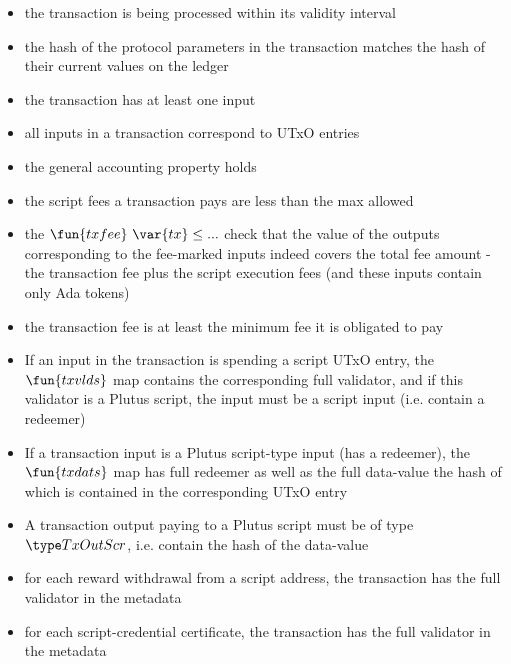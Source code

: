 \begin{itemize}
  \item the transaction is being processed within its validity interval

  \item the hash of the protocol parameters in the transaction matches
  the hash of their current values on the ledger

  \item the transaction has at least one input

  \item all inputs in a transaction correspond to UTxO entries

  \item the general accounting property holds

  \item the script fees a transaction pays are less than the max allowed

  \item the $\fun{txfee}~\var{tx} \leq ...$ check
  that the value of the outputs corresponding to the fee-marked inputs
  indeed covers the total fee amount - the transaction fee plus the
  script execution fees (and these inputs contain only
  Ada tokens)

  \item the transaction fee is at least the minimum fee it is obligated to pay

  \item If an input in the transaction is spending a script UTxO entry,
  the $\fun{txvlds}$ map contains the corresponding full validator, and
  if this validator is a Plutus script, the input must be a script input
  (i.e. contain a redeemer)

  \item If a transaction input is a Plutus script-type input (has a redeemer), the
  $\fun{txdats}$ map has full redeemer as well as the full data-value
  the hash of which is contained in the corresponding UTxO entry

  \item A transaction output paying to a Plutus script must be of type
  $\TxOutScr$, i.e. contain the hash of the data-value

  \item for each reward withdrawal from a script address, the transaction
  has the full validator in the metadata

  \item for each script-credential certificate, the transaction
  has the full validator in the metadata


\end{itemize}
